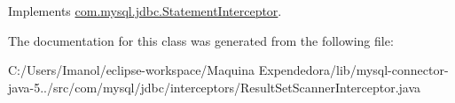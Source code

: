 Implements \mbox{\hyperlink{interfacecom_1_1mysql_1_1jdbc_1_1_statement_interceptor_ae8b6b08014d450768f3f7088f43ce593}{com.\+mysql.\+jdbc.\+Statement\+Interceptor}}.



The documentation for this class was generated from the following file\+:\begin{DoxyCompactItemize}
\item 
C\+:/\+Users/\+Imanol/eclipse-\/workspace/\+Maquina Expendedora/lib/mysql-\/connector-\/java-\/5../src/com/mysql/jdbc/interceptors/Result\+Set\+Scanner\+Interceptor.\+java\end{DoxyCompactItemize}
